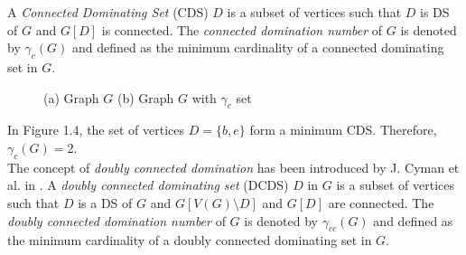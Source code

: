A \textit{Connected Dominating Set} (CDS) $D$ is a subset of vertices such that $D$ is DS of $G$ and $G[D]$ is connected. The \textit{connected domination number} of $G$ is denoted by $\gamma_c(G)$ and defined as the minimum cardinality of a connected dominating set in $G$.\\
\begin{figure}[H]
		\centering
\caption{(a) Graph $G$ (b) Graph $G$ with $\gamma_c$ set}
\end{figure}
\noindent
In Figure 1.4, the set of vertices $D= \{ b,e\}$ form a minimum CDS. Therefore,  $\gamma_c(G)=2$. \\
\noindent
The concept of \textit{doubly connected domination} has been introduced by J. Cyman et al. in \cite{dcds}. A \textit{doubly connected dominating set} (DCDS) $D$ in $G$ is a subset of vertices such that $D$ is a DS of $G$ and $G[V(G)\setminus D]$ and $G[D]$ are connected. The \textit{doubly connected domination number} of $G$ is denoted by $\gamma_{cc}(G)$ and defined as the minimum cardinality of a doubly connected dominating set in $G$.

